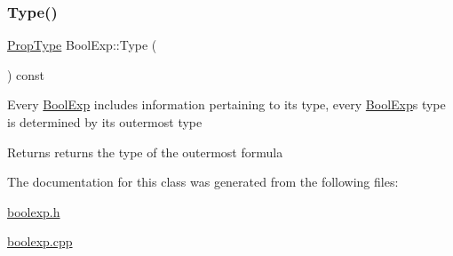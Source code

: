 \mbox{\label{classBoolExp_a1a6d410fe97a2b1b9452dd87a13b3082}} 
\subsubsection{\texorpdfstring{Type()}{Type()}}
{\footnotesize\ttfamily \mbox{\hyperlink{boolexp_8h_ac6a79184a0a7c1d2e3ea745512aa2d0c}{Prop\+Type}} Bool\+Exp\+::\+Type (\begin{DoxyParamCaption}{ }\end{DoxyParamCaption}) const\hspace{0.3cm}{\ttfamily [virtual]}}

Every \mbox{\hyperlink{classBoolExp}{Bool\+Exp}} includes information pertaining to its type, every \mbox{\hyperlink{classBoolExp}{Bool\+Exp}}\textquotesingle{}s type is determined by its outermost type \begin{DoxyReturn}{Returns}
returns the type of the outermost formula 
\end{DoxyReturn}


The documentation for this class was generated from the following files\+:\begin{DoxyCompactItemize}
\item 
\mbox{\hyperlink{boolexp_8h}{boolexp.\+h}}\item 
\mbox{\hyperlink{boolexp_8cpp}{boolexp.\+cpp}}\end{DoxyCompactItemize}
